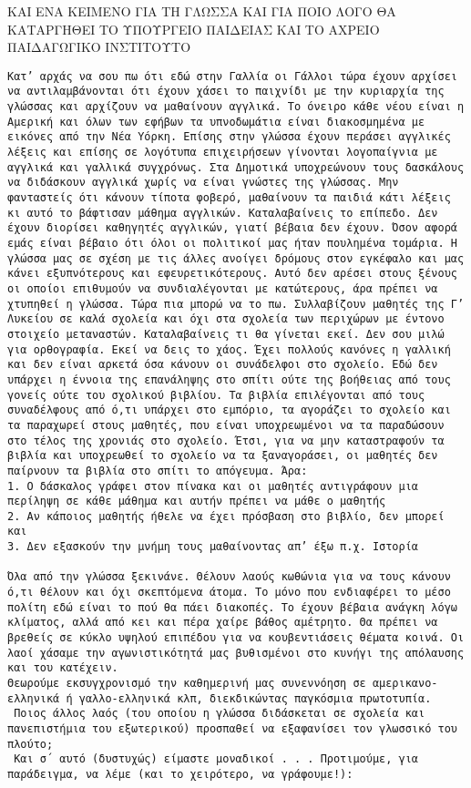 \documentclass[a4paper]{article}
\makeatletter
\newcommand{\verbatimfont}[1]{\def\verbatim@font{#1}}%
\makeatother
\begin{document}
ΚΑΙ ΕΝΑ ΚΕΙΜΕΝΟ ΓΙΑ ΤΗ ΓΛΩΣΣΑ ΚΑΙ ΓΙΑ ΠΟΙΟ ΛΟΓΟ ΘΑ ΚΑΤΑΡΓΗΘΕΙ ΤΟ ΥΠΟΥΡΓΕΙΟ ΠΑΙΔΕΙΑΣ ΚΑΙ ΤΟ ΑΧΡΕΙΟ ΠΑΙΔΑΓΩΓΙΚΟ ΙΝΣΤΙΤΟΥΤΟ
\verbatimfont{}
\begin{verbatim}
Κατ’ αρχάς να σου πω ότι εδώ στην Γαλλία οι Γάλλοι τώρα έχουν αρχίσει να αντιλαμβάνονται ότι έχουν χάσει το παιχνίδι με την κυριαρχία της γλώσσας και αρχίζουν να μαθαίνουν αγγλικά. Το όνειρο κάθε νέου είναι η Αμερική και όλων των εφήβων τα υπνοδωμάτια είναι διακοσμημένα με εικόνες από την Νέα Υόρκη. Επίσης στην γλώσσα έχουν περάσει αγγλικές λέξεις και επίσης σε λογότυπα επιχειρήσεων γίνονται λογοπαίγνια με αγγλικά και γαλλικά συγχρόνως. Στα Δημοτικά υποχρεώνουν τους δασκάλους να διδάσκουν αγγλικά χωρίς να είναι γνώστες της γλώσσας. Μην φανταστείς ότι κάνουν τίποτα φοβερό, μαθαίνουν τα παιδιά κάτι λέξεις κι αυτό το βάφτισαν μάθημα αγγλικών. Καταλαβαίνεις το επίπεδο. Δεν έχουν διορίσει καθηγητές αγγλικών, γιατί βέβαια δεν έχουν. Όσον αφορά εμάς είναι βέβαιο ότι όλοι οι πολιτικοί μας ήταν πουλημένα τομάρια. Η γλώσσα μας σε σχέση με τις άλλες ανοίγει δρόμους στον εγκέφαλο και μας κάνει εξυπνότερους και εφευρετικότερους. Αυτό δεν αρέσει στους ξένους οι οποίοι επιθυμούν να συνδιαλέγονται με κατώτερους, άρα πρέπει να χτυπηθεί η γλώσσα. Τώρα πια μπορώ να το πω. Συλλαβίζουν μαθητές της Γ’ Λυκείου σε καλά σχολεία και όχι στα σχολεία των περιχώρων με έντονο στοιχείο μεταναστών. Καταλαβαίνεις τι θα γίνεται εκεί. Δεν σου μιλώ για ορθογραφία. Εκεί να δεις το χάος. Έχει πολλούς κανόνες η γαλλική και δεν είναι αρκετά όσα κάνουν οι συνάδελφοι στο σχολείο. Εδώ δεν υπάρχει η έννοια της επανάληψης στο σπίτι ούτε της βοήθειας από τους γονείς ούτε του σχολικού βιβλίου. Τα βιβλία επιλέγονται από τους συναδέλφους από ό,τι υπάρχει στο εμπόριο, τα αγοράζει το σχολείο και τα παραχωρεί στους μαθητές, που είναι υποχρεωμένοι να τα παραδώσουν στο τέλος της χρονιάς στο σχολείο. Έτσι, για να μην καταστραφούν τα βιβλία και υποχρεωθεί το σχολείο να τα ξαναγοράσει, οι μαθητές δεν παίρνουν τα βιβλία στο σπίτι το απόγευμα. Άρα:
1. Ο δάσκαλος γράφει στον πίνακα και οι μαθητές αντιγράφουν μια περίληψη σε κάθε μάθημα και αυτήν πρέπει να μάθε ο μαθητής
2. Αν κάποιος μαθητής ήθελε να έχει πρόσβαση στο βιβλίο, δεν μπορεί και 
3. Δεν εξασκούν την μνήμη τους μαθαίνοντας απ’ έξω π.χ. Ιστορία

Όλα από την γλώσσα ξεκινάνε. Θέλουν λαούς κωθώνια για να τους κάνουν ό,τι θέλουν και όχι σκεπτόμενα άτομα. Το μόνο που ενδιαφέρει το μέσο πολίτη εδώ είναι το πού θα πάει διακοπές. Το έχουν βέβαια ανάγκη λόγω κλίματος, αλλά από κει και πέρα χαίρε βάθος αμέτρητο. Θα πρέπει να βρεθείς σε κύκλο υψηλού επιπέδου για να κουβεντιάσεις θέματα κοινά. Οι λαοί χάσαμε την αγωνιστικότητά μας βυθισμένοι στο κυνήγι της απόλαυσης και του κατέχειν.
Θεωρούμε εκσυγχρονισμό την καθημερινή μας συνεννόηση σε αμερικανο-ελληνικά ή γαλλο-ελληνικά κλπ, διεκδικώντας παγκόσμια πρωτοτυπία. 
 Ποιος άλλος λαός (του οποίου η γλώσσα διδάσκεται σε σχολεία και πανεπιστήμια του εξωτερικού) προσπαθεί να εξαφανίσει τον γλωσσικό του πλούτο; 
 Και σ΄ αυτό (δυστυχώς) είμαστε μοναδικοί . . . Προτιμούμε, για παράδειγμα, να λέμε (και το χειρότερο, να γράφουμε!): 
\end{verbatim}
\end{document}
